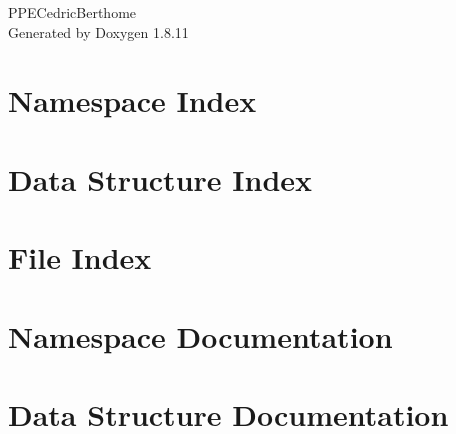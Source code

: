 \documentclass[twoside]{book}
\newcommand{\+}{\discretionary{\mbox{\scriptsize$\hookleftarrow$}}{}{}}
\newcommand{\clearemptydoublepage}{%
  \newpage{\pagestyle{empty}\cleardoublepage}%
}
\begin{document}
\hypersetup{pageanchor=false,
             bookmarksnumbered=true,
             pdfencoding=unicode
            }
\begin{titlepage}
\vspace*{7cm}
\begin{center}%
{\Large P\+P\+E\+Cedric\+Berthome }\\
\vspace*{1cm}
{\large Generated by Doxygen 1.8.11}\\
\end{center}
\end{titlepage}
\clearemptydoublepage
\tableofcontents
\clearemptydoublepage
{}
\hypersetup{pageanchor=true}

\chapter{Namespace Index}

\chapter{Data Structure Index}

\chapter{File Index}

\chapter{Namespace Documentation}

\chapter{Data Structure Documentation}

\end{document}
